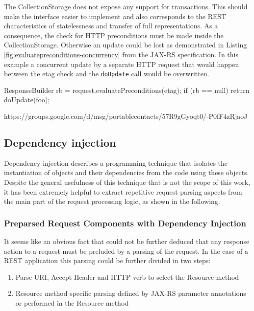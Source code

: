 \documentclass[11pt,a4paper,headsepline,twoside]{scrartcl}		%
\begin{document}
The CollectionStorage does not expose any support for transactions. This should
make the interface easier to implement and also corresponds to the REST
characteristics of statelessness and transfer of full representations. As a
consequence, the check for HTTP preconditions must be made inside the
CollectionStorage. Otherwise an update could be lost as demonstrated in Listing
\ref{fig:evaluatepreconditions-concurrency} from the JAX-RS
specification\cite[p. 28]{JAX-RS1.1}. In this example a concurrent update by a
separate HTTP request that would happen between the etag check and the
\lstinline:doUpdate: call would be overwritten.

\begin{javalisting}[label=fig:evaluatepreconditions-concurrency,
                   float=htb,
                   caption={Potential lost-update problem with JAX-RS}]
ResponseBuilder rb = request.evaluatePreconditions(etag);
if (rb == null) return doUpdate(foo);
\end{javalisting}



%
https://groups.google.com/d/msg/portablecontacts/57R9gGyoqt0/-P0fF4zRjaoJ

\subsection{Dependency injection}
\label{sec:dependency-injection}

Dependency injection describes a programming technique that isolates the
instantiation of objects and their dependencies from the code using these
objects. Despite the general usefulness of this technique that is not the scope
of this work, it has been extremely helpful to extract repetitive request
parsing aspects from the main part of the request processing logic, as shown in
the following.

\subsubsection{Preparsed Request Components with Dependency Injection}
\label{sec:prep-requ-comp}

It seems like an obvious fact that could not be further deduced that any
response action to a request must be preluded by a parsing of the request. In
the case of a REST application this parsing could be further divided in two
steps:
\begin{enumerate}
\item Parse URI, Accept Header and HTTP verb to select the Resource method
\item Resource method specific parsing defined by JAX-RS parameter annotations
  or performed in the Resource method
\end{enumerate}
\end{document}
